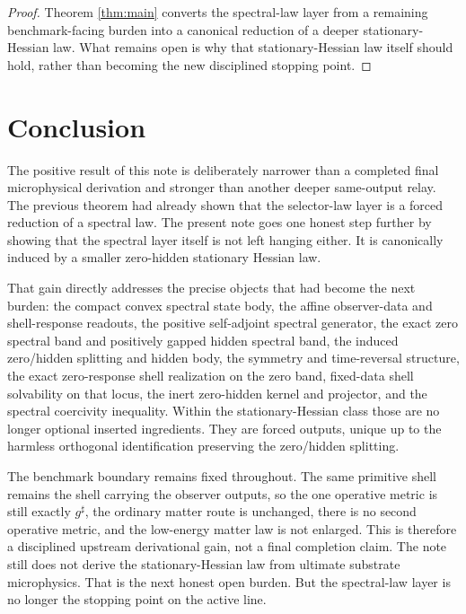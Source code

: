 \documentclass[11pt]{article}
\newcommand{\CompletedMetric}{g^{\sharp}}
\begin{document}
\begin{proof}
Theorem \ref{thm:main} converts the spectral-law layer from a remaining benchmark-facing burden into a canonical reduction of a deeper stationary-Hessian law. What remains open is why that stationary-Hessian law itself should hold, rather than becoming the new disciplined stopping point.
\end{proof}

\section{Conclusion}

The positive result of this note is deliberately narrower than a completed final microphysical derivation and stronger than another deeper same-output relay. The previous theorem had already shown that the selector-law layer is a forced reduction of a spectral law. The present note goes one honest step further by showing that the spectral layer itself is not left hanging either. It is canonically induced by a smaller zero-hidden stationary Hessian law.

That gain directly addresses the precise objects that had become the next burden: the compact convex spectral state body, the affine observer-data and shell-response readouts, the positive self-adjoint spectral generator, the exact zero spectral band and positively gapped hidden spectral band, the induced zero/hidden splitting and hidden body, the symmetry and time-reversal structure, the exact zero-response shell realization on the zero band, fixed-data shell solvability on that locus, the inert zero-hidden kernel and projector, and the spectral coercivity inequality. Within the stationary-Hessian class those are no longer optional inserted ingredients. They are forced outputs, unique up to the harmless orthogonal identification preserving the zero/hidden splitting.

The benchmark boundary remains fixed throughout. The same primitive shell remains the shell carrying the observer outputs, so the one operative metric is still exactly \(\CompletedMetric\), the ordinary matter route is unchanged, there is no second operative metric, and the low-energy matter law is not enlarged. This is therefore a disciplined upstream derivational gain, not a final completion claim. The note still does not derive the stationary-Hessian law from ultimate substrate microphysics. That is the next honest open burden. But the spectral-law layer is no longer the stopping point on the active line.
\end{document}
